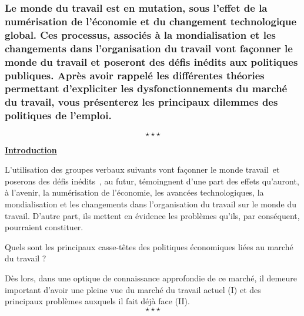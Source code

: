 \newpage %
	\subsubsection*{Le monde du travail est en mutation, sous l’effet de la numérisation de l’économie et du changement technologique global. Ces processus, associés à la mondialisation et les changements dans l’organisation du travail vont façonner le monde du travail et poseront des défis inédits aux politiques publiques. \newline \newline Après avoir rappelé les différentes théories permettant d’expliciter les dysfonctionnements du marché du travail, vous présenterez les principaux dilemmes des politiques de l’emploi.
	}
$$\star \star \star$$

%

\begin{center}
	\textbf{\underline{Introduction}} 
\end{center}

L'utilisation des groupes verbaux suivants \guillemetleft vont façonner le monde travail\guillemetright\ et \guillemetleft poserons des défis inédits\guillemetright\ , au futur, témoingnent d'une part des effets qu'auront, à l'avenir, la numérisation de l'économie, les avancées technologiques, la mondialisation et les changements dans l'organisation du travail sur le monde du travail. D'autre part, ils mettent en évidence les problèmes qu'ils, par conséquent, pourraient constituer. 

Quels sont les principaux casse-têtes des politiques économiques liées au marché du travail ?\newline

Dès lors, dans une optique de connaissance approfondie de ce marché, il demeure important d'avoir une pleine vue du marché du travail actuel (I) et des principaux problèmes auxquels il fait déjà face (II). $$\star \star \star$$

